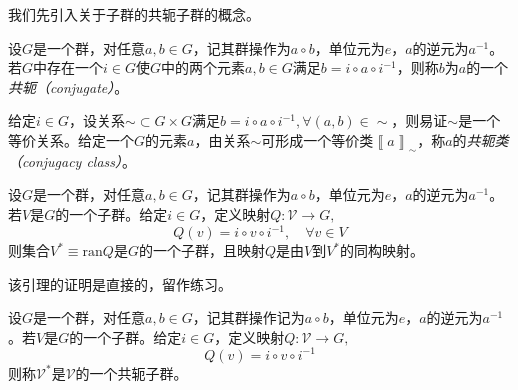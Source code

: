 \documentclass[main.tex]{subfiles}
\begin{document}
我们先引入关于子群的共轭子群的概念。

\begin{definition}\label{def:A.7}
    设$G$是一个群，对任意$a,b\in G$，记其群操作为$a\circ b$，单位元为$e$，$a$的逆元为$a^{-1}$。若$G$中存在一个$i\in G$使$G$中的两个元素$a,b\in G$满足$b=i\circ a\circ i^{-1}$，则称$b$为$a$的一个\emph{共轭（conjugate）}。
\end{definition}

给定$i\in G$，设关系$\sim\subset G\times G$满足$b=i\circ a\circ i^{-1},\forall\left(a,b\right)\in\sim$，则易证$\sim$是一个等价关系。给定一个$G$的元素$a$，由关系$\sim$可形成一个等价类$\left\llbracket a\right\rrbracket_\sim$，称$a$的\emph{共轭类（conjugacy class）}。

\begin{lemma}\label{lem:A.3}
    设$G$是一个群，对任意$a,b\in G$，记其群操作为$a\circ b$，单位元为$e$，$a$的逆元为$a^{-1}$。若$V$是$G$的一个子群。给定$i\in G$，定义映射$Q:\mathcal{V}\rightarrow G,$
    \[Q\left(v\right)=i\circ v\circ i^{-1},\quad\forall v\in V\]
    则集合$V^*\equiv\mathrm{ran}Q$是$G$的一个子群，且映射$Q$是由$V$到$V^*$的同构映射。
\end{lemma}

该引理的证明是直接的，留作练习。

\begin{definition}[共轭子群]\label{def:A.8}
    设$G$是一个群，对任意$a,b\in G$，记其群操作记为$a\circ b$，单位元为$e$，$a$的逆元为$a^{-1}$。若$V$是$G$的一个子群。给定$i\in G$，定义映射$Q:\mathcal{V}\rightarrow G,$
    \[Q\left(v\right)=i\circ v\circ i^{-1}\]
    则称$\mathcal{V}^*$是$\mathcal{V}$的一个共轭子群。
\end{definition}
\end{document}
